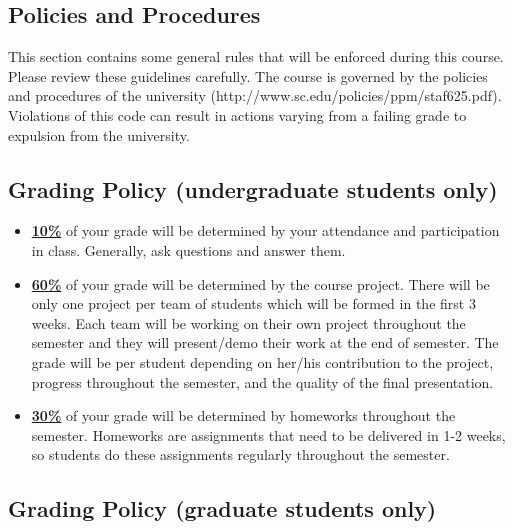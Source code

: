 \documentclass[11pt]{article}
\begin{document}
\subsection*{Policies and Procedures}

This section contains some general rules that will be enforced during this course. Please review these guidelines carefully. The course is governed by the policies and procedures of the university (http://www.sc.edu/policies/ppm/staf625.pdf). Violations of this code can result in actions varying from a failing grade to expulsion from the university.


\newpage

\subsection*{Grading Policy (undergraduate students only)}
\begin{itemize}
  \item \underline{\textbf{10\%}} of your grade will be determined by your attendance and participation in class. Generally, ask questions and answer them.

  \item \underline{\textbf{60\%}} of your grade will be determined by the course project. There will be only one project per team of students which will be formed in the first 3 weeks. Each team will be working on their own project throughout the semester and they will present/demo their work at the end of semester. The grade will be per student depending on her/his contribution to the project, progress throughout the semester, and the quality of the final presentation.

  \item \underline{\textbf{30\%}} of your grade will be determined by homeworks throughout the semester. Homeworks are assignments that need to be delivered in 1-2 weeks, so students do these assignments regularly throughout the semester.

\end{itemize}

\subsection*{Grading Policy (graduate students only)}
\end{document}
